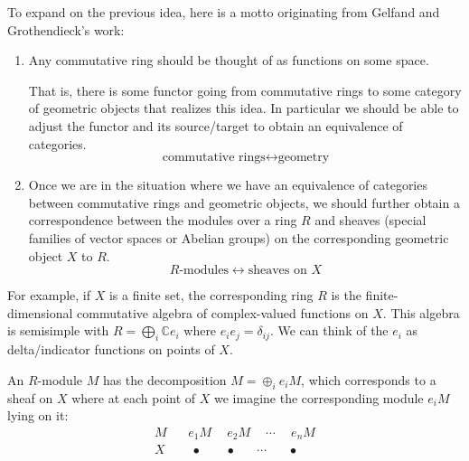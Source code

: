 \documentclass[11pt,leqno]{article}
\theoremstyle{plain}
\theoremstyle{definition}
\numberwithin{equation}{section}
\numberwithin{lem}{section}
\begin{document}
To expand on the previous idea, here is a motto originating from Gelfand and Grothendieck's work:
\begin{enumerate}
  \item Any commutative ring should be thought of as functions on some space.
  
  That is, there is some functor going from commutative rings to some category of geometric objects that realizes this idea. In particular we should be able to adjust the functor and its source/target to obtain an equivalence of categories.
  \[\text{commutative rings}\longleftrightarrow \text{geometry}\]
  \item Once we are in the situation where we have an equivalence of categories between commutative rings and geometric objects, we should further obtain a correspondence between the modules over a ring $R$ and sheaves (special families of vector spaces or Abelian groups) on the corresponding geometric object $X$ to $R$.
  \[R\text{-modules}\longleftrightarrow \text{sheaves on }X\]
\end{enumerate}
For example, if $X$ is a finite set, the corresponding ring $R$ is the finite-dimensional commutative algebra of complex-valued functions on $X$. This algebra is semisimple with $R = \bigoplus_i \mathbb Ce_i$ where $e_ie_j = \delta_{ij}$. We can think of the $e_i$ as delta/indicator functions on points of $X$.

An $R$-module $M$ has the decomposition $M = \oplus_i e_i M$, which corresponds to a sheaf on $X$ where at each point of $X$ we imagine the corresponding module $e_iM$ lying on it:
\begin{align*}
  M &~~~~ e_1M \phantom{\oplus} e_2M \phantom{\oplus} \cdots \phantom{\oplus} e_n M\\
  X&~~~~~\bullet~\phantom{\oplus}~~\bullet~~\phantom{\oplus} \cdots \phantom{\oplus}~~\bullet
\end{align*}
\end{document}
